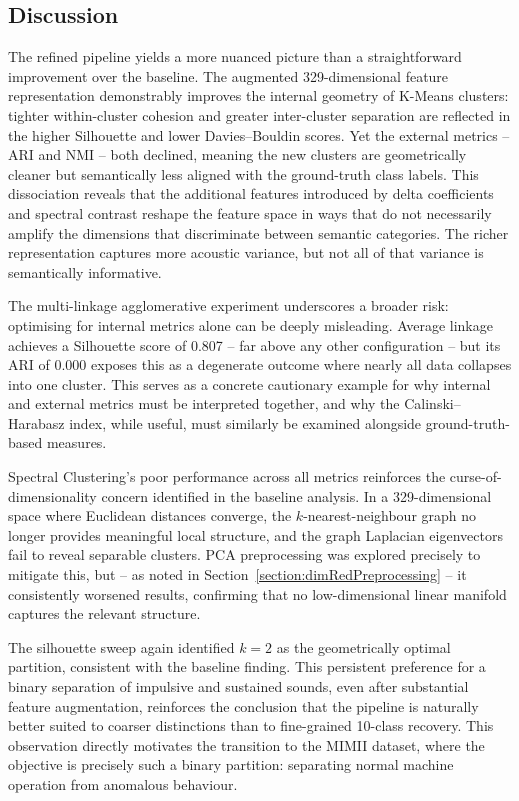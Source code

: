\documentclass[runningheads,a4paper,11pt]{report}
\begin{document}
\subsection{Discussion}
\label{section:refinedDiscussion}

The refined pipeline yields a more nuanced picture than a straightforward improvement over the baseline. The augmented 329-dimensional feature representation demonstrably improves the internal geometry of K-Means clusters: tighter within-cluster cohesion and greater inter-cluster separation are reflected in the higher Silhouette and lower Davies--Bouldin scores. Yet the external metrics -- ARI and NMI -- both declined, meaning the new clusters are geometrically cleaner but semantically less aligned with the ground-truth class labels. This dissociation reveals that the additional features introduced by delta coefficients and spectral contrast reshape the feature space in ways that do not necessarily amplify the dimensions that discriminate between semantic categories. The richer representation captures more acoustic variance, but not all of that variance is semantically informative.

The multi-linkage agglomerative experiment underscores a broader risk: optimising for internal metrics alone can be deeply misleading. Average linkage achieves a Silhouette score of 0.807 -- far above any other configuration -- but its ARI of 0.000 exposes this as a degenerate outcome where nearly all data collapses into one cluster. This serves as a concrete cautionary example for why internal and external metrics must be interpreted together, and why the Calinski--Harabasz index, while useful, must similarly be examined alongside ground-truth-based measures.

Spectral Clustering's poor performance across all metrics reinforces the curse-of-dimensionality concern identified in the baseline analysis. In a 329-dimensional space where Euclidean distances converge, the $k$-nearest-neighbour graph no longer provides meaningful local structure, and the graph Laplacian eigenvectors fail to reveal separable clusters. PCA preprocessing was explored precisely to mitigate this, but -- as noted in Section~\ref{section:dimRedPreprocessing} -- it consistently worsened results, confirming that no low-dimensional linear manifold captures the relevant structure.

The silhouette sweep again identified $k = 2$ as the geometrically optimal partition, consistent with the baseline finding. This persistent preference for a binary separation of impulsive and sustained sounds, even after substantial feature augmentation, reinforces the conclusion that the pipeline is naturally better suited to coarser distinctions than to fine-grained 10-class recovery. This observation directly motivates the transition to the MIMII dataset, where the objective is precisely such a binary partition: separating normal machine operation from anomalous behaviour.
\end{document}
